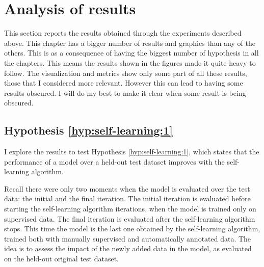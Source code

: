 \section{Analysis of results}\label{sec:self-learning:results}

This section reports the results obtained through the experiments described
above. This chapter has a bigger number of results and graphics than any of the
others. This is as a consequence of having the biggest number of hypothesis in
all the chapters. This means the results shown in the figures made it quite
heavy to follow. The visualization and metrics show only some part of all these
results, those that I considered more relevant. However this can lead to having
some results obscured. I will do my best to make it clear when some result is
being obscured.

\subsection{Hypothesis \ref{hyp:self-learning:1}}\label{sec:self-learning:hyp:1}

I explore the results to test Hypothesis \ref{hyp:self-learning:1}, which
states that the performance of a model over a held-out test dataset improves
with the self-learning algorithm.

Recall there were only two moments when the model is evaluated over the test
data: the initial and the final iteration. The initial iteration is evaluated
before starting the self-learning algorithm iterations, when the model is
trained only on supervised data. The final iteration is evaluated after the
self-learning algorithm stops. This time the model is the last one obtained by
the self-learning algorithm, trained both with manually supervised and
automatically annotated data. The idea is to assess the impact of the newly
added data in the model, as evaluated on the held-out original test dataset.

